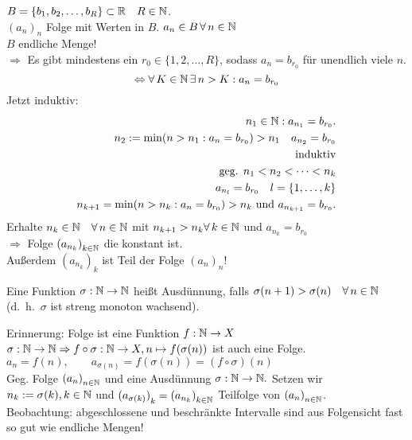 \documentclass[../ana1.tex]{subfiles}
\begin{document}
\begin{bsp}
	\(B= \{b_1, b_2,\ldots,b_R \} \subset \mathbb{R} \quad R\in\mathbb{N} \).\\
	\( {(a_n)}_n \) Folge mit Werten in \(B\).
	\(a_n \in B \, \forall n\in\N \) \\
	\(B\) endliche Menge!\\
	\( \Rightarrow \) Es gibt mindestens ein \(r_0 \in \{1,2,\ldots,R\} \), sodass \( a_n=b_{r_0}  \) für unendlich viele \(n\).\\
	\[ \Leftrightarrow \forall K\in\N \,\exists n>K : a_n = b_{r_0} \]
	Jetzt induktiv: \\
	\begin{align*}
		n_1 \in\mathbb{N}: a_{n_1} = b_{r_0}.\\
		n_2 := \min (n>n_1:a_n=b_{r_0}) >n_1 \quad a_{n_2} = b_{r_0}\\
		\text{induktiv}\\
		\text{geg. } n_1 < n_2<\cdots<n_k\\
		a_{n_l} = b_{r_0} \quad l = \{1, \ldots,k \} \\
		n_{k+1} = \min(n>n_k:a_n = b_{r_0}) > n_k \text{ und } a_{n_{k+1}} = b_{r_0}.
	\end{align*}
	Erhalte \(n_k\in\N \quad \forall n\in\N \) mit \( n_{k+1} > n_k \forall k\in\N \) und \( a_{n_k} = b_{r_0} \) \\
	\( \Rightarrow \) Folge \( {(a_{n_k})}_{k\in\mathbb{N}} \) die konstant ist.\\
	Außerdem \( {(a_{n_k})}_k \) ist Teil der Folge \( {(a_n)}_n \)!
\end{bsp}
\begin{defi}[Teilfolge]
	Eine Funktion \( \sigma:\mathbb{N} \rightarrow\mathbb{N} \) heißt Ausdünnung, falls \( \sigma (n+1) > \sigma(n) \quad \forall n\in\N \) (d.\ h.\  \(\sigma \) ist streng monoton wachsend).
\end{defi}
Erinnerung: Folge ist eine Funktion \(f: \mathbb{N}\rightarrow X \) \\
\( \sigma : \mathbb{N}\rightarrow\mathbb{N} \Rightarrow f \circ \sigma : \mathbb{N}\rightarrow X, n\mapsto f(\sigma(n))  \) ist auch eine Folge.\\
\(a_n = f(n),\qquad a_{\sigma(n)} = f(\sigma(n)) = (f\circ\sigma)(n) \) \\
Geg. Folge \( {(a_n)}_{n\in\mathbb{N}} \) und eine Ausdünnung \( \sigma : \mathbb{N}\rightarrow \mathbb{N}. \) Setzen wir \( n_k := \sigma (k), k\in\mathbb{N} \) und \( {(a_{\sigma(k)})}_k = {(a_{n_k})}_{k\in\mathbb{N}} \) Teilfolge von \( {(a_n)}_{n\in\mathbb{N}} \).\\
Beobachtung: abgeschlossene und beschränkte Intervalle sind aus Folgensicht fast so gut wie endliche Mengen!
\end{document}
